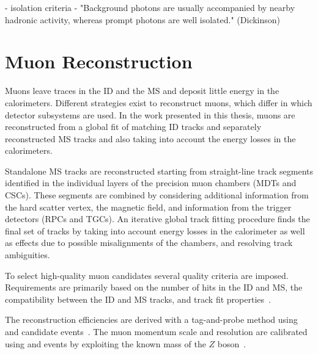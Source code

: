 - isolation criteria
- "Background photons are usually accompanied by nearby hadronic activity, whereas prompt photons are well isolated." (Dickinson)




\section{Muon Reconstruction}
Muons leave traces in the ID and the MS and deposit little energy in the calorimeters.
Different strategies exist to reconstruct muons, which differ in which detector subsystems are used.
In the work presented in this thesis, muons are reconstructed from a global fit of matching ID tracks and separately reconstructed MS tracks and also taking into account the energy losses in the calorimeters.

Standalone MS tracks are reconstructed starting from straight-line track segments identified in the individual layers of the precision muon chambers (MDTs and CSCs).
These segments are combined by considering additional information from the hard scatter vertex, the magnetic field, and information from the trigger detectors (RPCs and TGCs). An iterative global track fitting procedure finds the final set of tracks by taking into account energy losses in the calorimeter as well as effects due to possible misalignments of the chambers, and resolving track ambiguities. \cite{MUON-2018-03}

To select high-quality muon candidates several quality criteria are imposed.
Requirements are primarily based on the number of hits in the ID and MS, the compatibility between the ID and MS tracks, and track fit properties~\cite{MUON-2018-03}.

The reconstruction efficiencies are derived with a tag-and-probe method using \Jpsimumu and \Zmumu candidate events~\cite{MUON-2018-03}.
The muon momentum scale and resolution are calibrated using \Jpsimumu and \Zmumu events by exploiting the known mass of the $Z$ boson~\cite{PERF-2015-10}.





